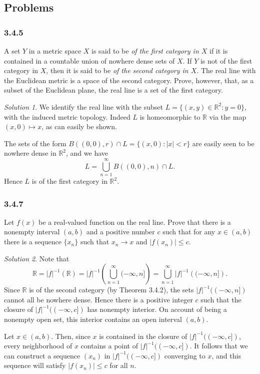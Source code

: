 \documentclass{report}
\newcommand{\bb}[1]{\mathbb{#1}}
\theoremstyle{remark}
\newtheorem*{solution}{Solution}
\begin{document}
\subsection*{Problems}

\subsubsection*{3.4.5}
A set $Y$ in a metric space $X$ is said to be \emph{of the first category in $X$} if it is contained in a countable union of nowhere dense sets of $X$. If $Y$ is not of the first category in $X$, then it is said to be \emph{of the second category in $X$}. The real line with the Euclidean metric is a space of the second category. Prove, however, that, as a subset of the Euclidean plane, the real line is a set of the first category.

\begin{solution}
  We identify the real line with the subset $L = \{(x,y) \in \bb R^2: y = 0\}$, with the induced metric topology. Indeed $L$ is homeomorphic to $\bb R$ via the map $(x,0) \mapsto x$, as can easily be shown.

  The sets of the form $B((0,0), r) \cap L = \{(x,0): |x| < r\}$ are easily seen to be nowhere dense in $\bb R^2$, and we have
  \begin{equation*}
    L = \bigcup_{n=1}^\infty B((0,0), n) \cap L.
  \end{equation*}
  Hence $L$ is of the first category in $\bb R^2$.
\end{solution}

\subsubsection*{3.4.7}
Let $f(x)$ be a real-valued function on the real line. Prove that there is a nonempty interval $(a,b)$ and a positive number $c$ such that for any $x \in (a,b)$ there is a sequence $\{x_n\}$ such that $x_n \to x$ and $|f(x_n)| \le c$.

\begin{solution}
  Note that
  \begin{equation*}
    \bb R = |f|^{-1}(\bb R) = |f|^{-1} \left( \bigcup_{n=1}^\infty (-\infty,n] \right) = \bigcup_{n=1}^\infty |f|^{-1} \left( (-\infty,n] \right).
  \end{equation*}
  Since $\bb R$ is of the second category (by Theorem 3.4.2), the sets $|f|^{-1}((-\infty,n])$ cannot all be nowhere dense. Hence there is a positive integer $c$ such that the closure of $|f|^{-1}((-\infty,c])$ has nonempty interior. On account of being a nonempty open set, this interior contains an open interval $(a,b)$.

  Let $x \in (a,b)$. Then, since $x$ is contained in the closure of $|f|^{-1}((-\infty,c])$, every neighborhood of $x$ contains a point of $|f|^{-1}((-\infty,c])$. It follows that we can construct a sequence $(x_n)$ in $|f|^{-1}((-\infty,c])$ converging to $x$, and this sequence will satisfy $|f(x_n)| \le c$ for all $n$.
\end{solution}
\end{document}
